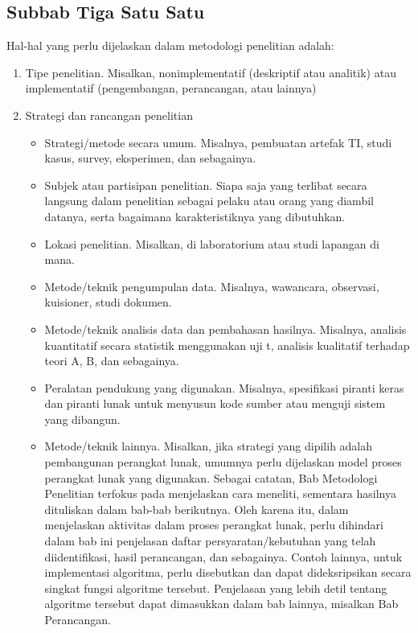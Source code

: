 \subsection{Subbab Tiga Satu Satu}

Hal-hal yang perlu dijelaskan dalam metodologi penelitian adalah: 
\begin{enumerate}
  \item Tipe penelitian. Misalkan, nonimplementatif (deskriptif atau analitik) atau implementatif (pengembangan, perancangan, atau lainnya)
  \item Strategi dan rancangan penelitian 
  \begin{itemize}
    \item Strategi/metode secara umum. Misalnya, pembuatan artefak TI, studi kasus, survey, eksperimen, dan sebagainya. 
    \item Subjek atau partisipan penelitian. Siapa saja yang terlibat secara langsung dalam penelitian sebagai pelaku atau orang yang diambil datanya, serta bagaimana karakteristiknya yang dibutuhkan.
    \item Lokasi penelitian. Misalkan, di laboratorium atau studi lapangan di mana.
    \item Metode/teknik pengumpulan data. Misalnya, wawancara, observasi, kuisioner, studi dokumen.
    \item Metode/teknik analisis data dan pembahasan hasilnya. Misalnya, analisis kuantitatif secara statistik menggunakan uji t, analisis kualitatif terhadap teori A, B, dan sebagainya.
    \item Peralatan pendukung yang digunakan. Misalnya, spesifikasi piranti keras dan piranti lunak untuk menyusun kode sumber atau menguji sistem yang dibangun.
    \item Metode/teknik lainnya. Misalkan, jika strategi yang dipilih adalah pembangunan perangkat lunak, umumnya perlu dijelaskan model proses perangkat lunak yang digunakan. Sebagai catatan, Bab Metodologi Penelitian terfokus pada menjelaskan cara meneliti, sementara hasilnya dituliskan dalam bab-bab berikutnya. Oleh karena itu, dalam menjelaskan aktivitas dalam proses perangkat lunak, perlu dihindari dalam bab ini penjelasan daftar persyaratan/kebutuhan yang telah diidentifikasi, hasil perancangan, dan sebagainya. Contoh lainnya, untuk implementasi algoritma, perlu disebutkan dan dapat dideksripsikan secara singkat fungsi algoritme tersebut. Penjelasan yang lebih detil tentang algoritme tersebut dapat dimasukkan dalam bab lainnya, misalkan Bab Perancangan. 
  \end{itemize}
\end{enumerate}


